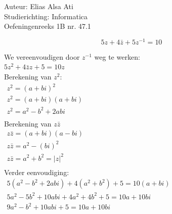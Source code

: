 \documentclass[a4paper]{article}
\begin{document}
\noindent \large Auteur: Elias Alsa Ati                         \\
\noindent \large Studierichting: Informatica                    \\
\noindent \large Oefeningenreeks 1B nr. 47.1                    \\

\medskip

\normalsize

$$5z + 4 \bar{z} + 5 z^{-1} = 10$$

We vereenvoudigen door $z^{-1}$ weg te werken:  \\

$5z^2 + 4 \bar{z} z + 5 = 10z$                  \\

Berekening van $z^2$:                           \\

$\begin{array}{l}
    z^2 = (a + bi)^2                            \\
    z^2 = (a + bi)(a + bi)                      \\
    z^2 = a^2 - b^2 + 2abi                      \\
\end{array}$                                    \\

Berekening van $z\bar{z}$                       \\

$\begin{array}{l}
    z\bar{z} = (a + bi)(a - bi)                 \\
    z\bar{z} = a^2 - (bi)^2                     \\
    z\bar{z} = a^2 + b^2 = |z|^2                \\
\end{array}$                                    \\

Verder eenvoudiging:                            \\

$\begin{array}{l}
    5\left(a^2 - b^2 + 2abi\right) + 4 \left(a^2 + b^2\right) + 5   = 10 \left(a + bi\right)    \\
    5 a^2 - 5 b^2 + 10 abi + 4 a^2 + 4 b^2 + 5                      = 10 a + 10 bi              \\
    9 a^2 - b^2 + 10 abi + 5                                        = 10 a + 10 bi              \\
\end{array}$                        \\
\end{document}
